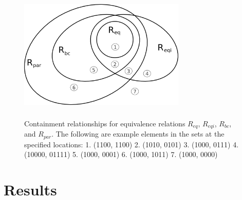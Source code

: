 \documentclass{article}
\theoremstyle{definition}
\begin{document}
\begin{figure}
  \begin{center}
    \includegraphics[width=300px,height=241px,keepaspectratio=true]
                    {containments.png}
  \end{center}
  \caption{ \label{fig:containments} Containment relationships for equivalence
    relations $R_{eq}$, $R_{eqi}$, $R_{bc}$, and $R_{par}$. The following are
    example elements in the sets at the specified locations: 1. (1100, 1100)
    2. (1010, 0101) 3. (1000, 0111) 4. (10000, 01111) 5. (1000, 0001) 6. (1000,
    1011) 7. (1000, 0000) }
\end{figure}

\section{Results}
\end{document}
